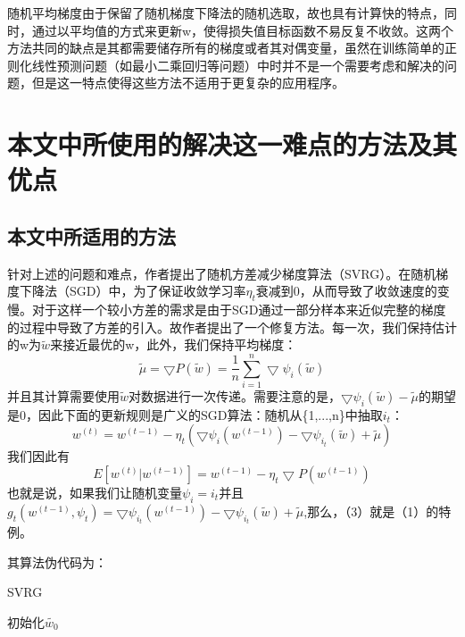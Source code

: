 \documentclass[12pt, a4paper, oneside]{ctexart}
\begin{document}
随机平均梯度由于保留了随机梯度下降法的随机选取，故也具有计算快的特点，同时，通过以平均值的方式来更新w，使得损失值目标函数不易反复不收敛。这两个方法共同的缺点是其都需要储存所有的梯度或者其对偶变量，虽然在训练简单的正则化线性预测问题（如最小二乘回归等问题）中时并不是一个需要考虑和解决的问题，但是这一特点使得这些方法不适用于更复杂的应用程序。
\\[8pt]

\newpage

\section{本文中所使用的解决这一难点的方法及其优点}

\subsection{本文中所适用的方法}

针对上述的问题和难点，作者提出了随机方差减少梯度算法（SVRG）。在随机梯度下降法（SGD）中，为了保证收敛学习率$\eta _t$衰减到0，从而导致了收敛速度的变慢。对于这样一个较小方差的需求是由于SGD通过一部分样本来近似完整的梯度的过程中导致了方差的引入。故作者提出了一个修复方法。每一次，我们保持估计的w为$\tilde{w}$来接近最优的w，此外，我们保持平均梯度：
\begin{equation}
\tilde{\mu}=\bigtriangledown P(\tilde{w})=\frac{1}{n}\sum_{i=1}^{n}\bigtriangledown \psi_i(\tilde{w})
\end{equation}
并且其计算需要使用$\tilde{w}$对数据进行一次传递。需要注意的是，$\bigtriangledown \psi_i(\tilde{w})-\tilde{\mu}$的期望是0，因此下面的更新规则是广义的SGD算法：随机从\{1,...,n\}中抽取$i_t$：
\begin{equation}
w^{(t)}=w^{(t-1)}-\eta_t(\bigtriangledown \psi_i(w^{(t-1)})-\bigtriangledown\psi_{i_t}(\tilde{w})+\tilde{\mu})
\end{equation}
我们因此有
\begin{equation}
E[w^{(t)}|w^{(t-1)}]=w^{(t-1)}-\eta_t\bigtriangledown P(w^{(t-1)})
\end{equation}
也就是说，如果我们让随机变量$\psi_i=i_t$并且$g_t(w^{(t-1)},\psi_t)=\bigtriangledown\psi_{i_t}(w^{(t-1)})-\bigtriangledown\psi_{i_t}(\tilde{w})+\tilde{\mu}$,那么，（3）就是（1）的特例。

其算法伪代码为：

\begin{algorithm}[] 
	\caption{SVRG}%
	\LinesNumbered %
	初始化$\tilde{w_0}$\; %
\end{algorithm}
\end{document}
